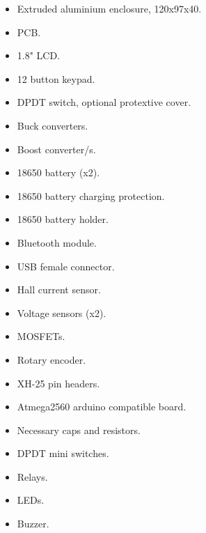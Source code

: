 \documentclass{article}
\begin{document}
\begin{itemize}
	\item Extruded aluminium enclosure, 120x97x40.
	\item PCB.
	\item 1.8" LCD.
	\item 12 button keypad.
	\item DPDT switch, optional protextive cover.
	\item Buck converters.
	\item Boost converter/s.
	\item 18650 battery (x2).
	\item 18650 battery charging protection.
	\item 18650 battery holder.
	\item Bluetooth module.
	\item USB female connector.
	\item Hall current sensor.
	\item Voltage sensors (x2).
	\item MOSFETs.
	\item Rotary encoder.
	\item XH-25 pin headers.
	\item Atmega2560 arduino compatible board.
	\item Necessary caps and resistors.
	\item DPDT mini switches.
	\item Relays.
	\item LEDs.
	\item Buzzer.
\end{itemize}
\end{document}
